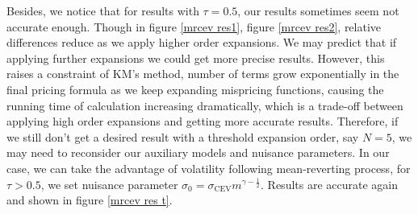 Besides, we notice that for results with $\tau=0.5$, our results sometimes seem not accurate enough. Though in figure \ref{mrcev res1}, figure \ref{mrcev res2}, relative differences reduce as we apply higher order expansions. We may predict that if applying further expansions we could get more precise results. However, this raises a constraint of KM's method, number of terms grow exponentially in the final pricing formula as we keep expanding mispricing functions, causing the running time of calculation increasing dramatically, which is a trade-off between applying high order expansions and getting more accurate results. Therefore, if we still don't get a desired result with a threshold expansion order, say $N=5$, we may need to reconsider our auxiliary models and nuisance parameters. In our case, we can take the advantage of volatility following mean-reverting process, for $\tau>0.5$, we set nuisance parameter $\sigma_0 = \sigma_{\text{CEV}}m^{\gamma-\frac{1}{2}}$. Results are accurate again and shown in figure \ref{mrcev res t}.

